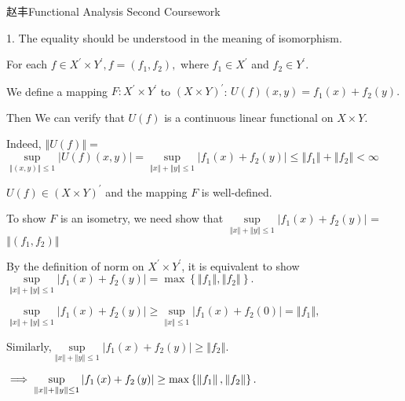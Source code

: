 \documentclass{article}
\begin{document}
\bigskip 赵丰\qquad \qquad Functional Analysis
Second Coursework


1. The equality should be understood in the meaning of isomorphism.

For each $f\in X^{\prime }\times Y^{\prime },f=\left( f_{1},f_{2}\right) ,$
where $f_{1}\in X^{\prime }$ and $f_{2}\in Y^{\prime }.$

We define a mapping $F:X^{\prime }\times Y^{\prime }$ to $\left( X\times
Y\right) ^{\prime }$: $U\left( f\right) \left( x,y\right) =f_{1}\left(
x\right) +f_{2}\left( y\right) .$

\bigskip Then We can verify that $U\left( f\right) $ is a continuous linear
functional on $X\times Y.$

Indeed, $\left\Vert U\left( f\right) \right\Vert =$ $\underset{\left\Vert
\left( x,y\right) \right\Vert \leq 1}{\sup }\left\vert U\left( f\right)
\left( x,y\right) \right\vert =\underset{\left\Vert x\right\Vert +\left\Vert
y\right\Vert \leq 1}{\sup }\left\vert f_{1}\left( x\right) +f_{2}\left(
y\right) \right\vert \leq \left\Vert f_{1}\right\Vert +\left\Vert
f_{2}\right\Vert <\infty $

$U\left( f\right) \in \left( X\times Y\right) ^{\prime }$ and the mapping $F$
is well-defined.

To show $F$ is an isometry, we need show that $\underset{\left\Vert
x\right\Vert +\left\Vert y\right\Vert \leq 1}{\sup }\left\vert f_{1}\left(
x\right) +f_{2}\left( y\right) \right\vert $ =$\left\Vert \left(
f_{1},f_{2}\right) \right\Vert $

By the definition of norm on $X^{\prime }\times Y^{\prime }$, it is
equivalent to show$\underset{\left\Vert x\right\Vert +\left\Vert
y\right\Vert \leq 1}{\sup }\left\vert f_{1}\left( x\right) +f_{2}\left(
y\right) \right\vert =\max \left\{ \left\Vert f_{1}\right\Vert ,\left\Vert
f_{2}\right\Vert \right\} .$

$\underset{\left\Vert x\right\Vert +\left\Vert y\right\Vert \leq 1}{\sup }%
\left\vert f_{1}\left( x\right) +f_{2}\left( y\right) \right\vert \geq 
\underset{\left\Vert x\right\Vert \leq 1}{\sup }\left\vert f_{1}\left(
x\right) +f_{2}\left( 0\right) \right\vert =\left\Vert f_{1}\right\Vert ,$

Similarly,$\underset{\left\Vert x\right\Vert +\left\Vert y\right\Vert \leq 1}%
{\sup }\left\vert f_{1}\left( x\right) +f_{2}\left( y\right) \right\vert
\geq \left\Vert f_{2}\right\Vert .$

$\implies \underset{\left\Vert x\right\Vert +\left\Vert y\right\Vert \leq 1}{%
\sup }\left\vert f_{1}\left( x\right) +f_{2}\left( y\right) \right\vert \geq
\max \left\{ \left\Vert f_{1}\right\Vert ,\left\Vert f_{2}\right\Vert
\right\} .$
\end{document}
